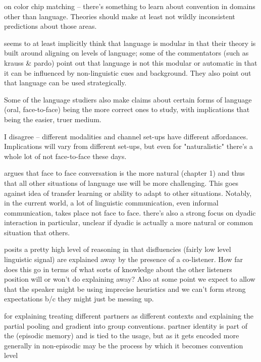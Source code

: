 \documentclass[]{article}
\begin{document}
\cite{murthy2022} on color chip matching -- there's something to learn about convention in domains other than language. Theories should make at least not wildly inconsistent predictions about those areas. 

\cite{pickering2004} seems to at least implicitly think that language is modular in that their theory is built around aligning on levels of language; some of the commentators (such as krauss \& pardo) point out that language is not this modular or automatic in that it can be influenced by non-linguistic cues and background. They also point out that language can be used strategically. 

Some of the language studiers also make claims about certain forms of language (oral, face-to-face) being the more correct ones to study, with implications that being the easier, truer medium. 

I disagree -- different modalities and channel set-ups have different affordances. Implications will vary from different set-ups, but even for "naturalistic" there's a whole lot of not face-to-face these days. 

\cite{clark1996} argues that face to face conversation is the more natural (chapter 1) and thus that all other situations of language use will be more challenging. This goes against idea of transfer learning or ability to adapt to other situations. Notably, in the current world, a lot of linguistic communication, even informal communication, takes place not face to face. there's also a strong focus on dyadic interaction in particular, unclear if dyadic is actually a more natural or common situation that others.

\cite{yoon2014} posits a pretty high level of reasoning in that disfluencies (fairly low level linguistic signal) are explained away by the presence of a co-listener. How far does this go in terms of what sorts of knowledge about the other listeners position will or won't do explaining away? Also at some point we expect to allow that the speaker might be using imprecise heuristics and we can't form strong expectations b/c they might just be messing up. 



\cite{hawkins2021} for explaining treating different partners as different contexts and explaining the partial pooling and gradient into group conventions. partner identity is part of the (episodic memory) and is tied to the usage, but as it gets encoded more generally in non-episodic may be the process by which it becomes convention level 
\end{document}
